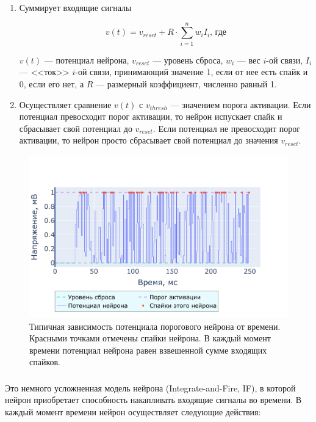 \documentclass[a4paper]{article}
\begin{document}
\begin{enumerate}
 \item Суммирует входящие сигналы

\begin{equation} \label{eq:thresh}
v(t) = v_{reset} + R \cdot \sum_{i=1}^n {w_i I_i} \text{, где}
\end{equation}

$v(t)$ --- потенциал нейрона, $v_{reset}$ --- уровень сброса, $w_i$ --- вес $i$-ой связи, $I_i$ --- <<ток>> $i$-ой связи, принимающий значение 1, если от нее есть спайк и 0, если его нет, а $R$ --- размерный коэффициент, численно равный 1.

\item Осуществляет сравнение $v(t)$ с $v_{thresh}$ --- значением порога активации. Если потенциал превосходит порог активации, то нейрон испускает спайк и сбрасывает свой потенциал до $v_{reset}$. Если потенциал не превосходит порог активации, то нейрон просто сбрасывает свой потенциал до значения $v_{reset}$.
\end{enumerate}

\begin{center}
\begin{figure}[H] 
 \includegraphics[width=\textwidth,keepaspectratio=true]{model_thresh_ru.pdf}
 \caption{Типичная зависимость потенциала порогового нейрона от времени. Красными точками отмечены спайки нейрона. В каждый момент времени потенциал нейрона равен взвешенной сумме входящих спайков.}
\end{figure}
\end{center}

\subsubsection{}
Это немного усложненная модель нейрона (Integrate-and-Fire, IF), в которой нейрон приобретает способность накапливать входящие сигналы во времени. В каждый момент времени нейрон осуществляет следующие действия:
\end{document}

